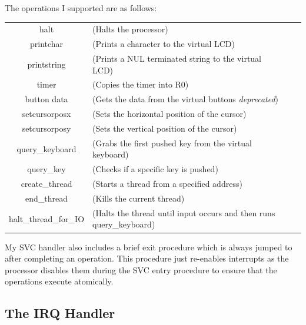 The operations I supported are as follows:

\begin{tabular}{cl cl}
	halt & (Halts the processor) \\
	printchar & (Prints a character to the virtual LCD) \\
	printstring & (Prints a NUL terminated string to the virtual LCD) \\
	timer & (Copies the timer into R0) \\
	button data  & (Gets the data from the virtual buttons \textit{deprecated}) \\
	setcursorposx & (Sets the horizontal position of the cursor) \\
	setcursorposy & (Sets the vertical position of the cursor) \\
	query\_keyboard & (Grabs the first pushed key from the virtual keyboard) \\
	query\_key & (Checks if a specific key is pushed) \\
	create\_thread & (Starts a thread from a specified address) \\
	end\_thread & (Kills the current thread) \\
	halt\_thread\_for\_IO & (Halts the thread until input occurs and then runs query\_keyboard) \\
\end{tabular} 
\bigskip

My SVC handler also includes a brief exit procedure which is always jumped to after completing an operation. This procedure just re-enables interrupts as the processor disables them during the SVC entry procedure to ensure that the operations execute atomically. 
\subsection{The IRQ Handler}
